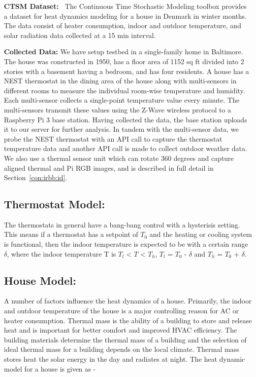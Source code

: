 \documentclass{sig-alternate}
\begin{document}
\indent \textbf{CTSM Dataset:~\cite{CTSM}} The Continuous Time Stochastic Modeling toolbox provides a dataset for heat dynamics modeling for a house in Denmark in winter months. The data consist of heater consumption, indoor and outdoor temperature, and solar radiation data collected at a 15 min interval.

\indent \textbf{Collected Data:} We have setup testbed in a single-family home in Baltimore. The house was constructed in 1950, has a floor area of 1152 sq ft divided into 2 stories with a basement having a bedroom, and has four residents. A house has a NEST thermostat in the dining area of the house along with multi-sensors \cite{Aeotec} in different rooms to measure the individual room-wise temperature and humidity. Each multi-sensor collects a single-point
temperature value every minute. The multi-sensors transmit these values using the Z-Wave wireless protocol to a Raspberry Pi 3 base station. Having collected the data, the base station uploads it to our server for further analysis. In tandem with the multi-sensor data, we probe the NEST thermostat with an API call to capture the thermostat temperature data and another API call is made to collect outdoor weather data. We also use a thermal sensor unit which can rotate 360 degrees and capture aligned thermal and Pi RGB images, and is described in full detail in Section~\ref{con:irbb:id}.   
\subsection{Thermostat Model:}

\indent The thermostats in general have  a bang-bang control with a hysterisis setting. This means if a thermostat has a setpoint of $T_0$ and the heating or cooling system is functional, then the indoor temperature is expected to be with a certain range $\delta$, where the indoor temperature T is $T_l$ < $T$ < $T_h$, $T_l$ = $T_0$ - $\delta$  and $T_h$ = $T_0$ + $\delta$. 

\subsection{House Model:} 

 A number of factors influence the heat dynamics of a house. Primarily, the indoor and outdoor temperature of the house is a major controlling reason for AC or heater consumption. Thermal mass is the ability of a building to store and release heat and is important for better comfort and improved HVAC efficiency. The building materials determine the thermal mass of a building and the selection of ideal thermal mass for a building depends on the local climate. Thermal mass stores heat the solar energy in the day and radiates at night. The heat dynamic model for a house is given as - 
\end{document}
